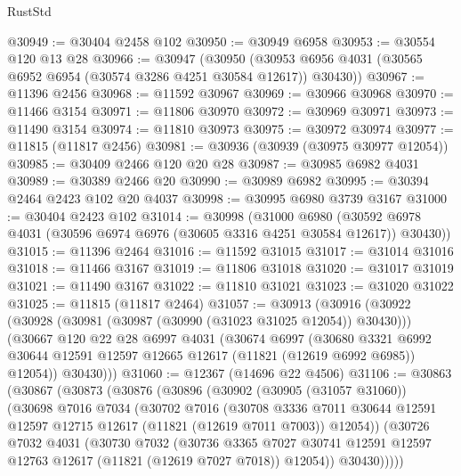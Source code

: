\begin{lexlean}{RustStd}
\begin{coremodule}
@30949 := @30404 @2458 @102
@30950 := @30949 @6958
@30953 := @30554 @120 @13 @28
@30966 := @30947
    (@30950 (@30953 @6956 @4031 (@30565 @6952 @6954 (@30574 @3286 @4251 @30584 @12617)) @30430))
@30967 := @11396 @2456
@30968 := @11592 @30967
@30969 := @30966 @30968
@30970 := @11466 @3154
@30971 := @11806 @30970
@30972 := @30969 @30971
@30973 := @11490 @3154
@30974 := @11810 @30973
@30975 := @30972 @30974
@30977 := @11815 (@11817 @2456)
@30981 := @30936 (@30939 (@30975 @30977 @12054))
@30985 := @30409 @2466 @120 @20 @28
@30987 := @30985 @6982 @4031
@30989 := @30389 @2466 @20
@30990 := @30989 @6982
@30995 := @30394 @2464 @2423 @102 @20 @4037
@30998 := @30995 @6980 @3739 @3167
@31000 := @30404 @2423 @102
@31014 := @30998
    (@31000
      @6980
      (@30592 @6978 @4031 (@30596 @6974 @6976 (@30605 @3316 @4251 @30584 @12617)) @30430))
@31015 := @11396 @2464
@31016 := @11592 @31015
@31017 := @31014 @31016
@31018 := @11466 @3167
@31019 := @11806 @31018
@31020 := @31017 @31019
@31021 := @11490 @3167
@31022 := @11810 @31021
@31023 := @31020 @31022
@31025 := @11815 (@11817 @2464)
@31057 := @30913
    (@30916
      (@30922
        (@30928 (@30981 (@30987 (@30990 (@31023 @31025 @12054)) @30430)))
        (@30667
          @120
          @22
          @28
          @6997
          @4031
          (@30674
            @6997
            (@30680
              @3321
              @6992
              @30644
              @12591
              @12597
              @12665
              @12617
              (@11821 (@12619 @6992 @6985))
              @12054))
          @30430)))
@31060 := @12367 (@14696 @22 @4506)
@31106 := @30863
    (@30867
      (@30873
        (@30876
          (@30896
            (@30902
              (@30905 (@31057 @31060))
              (@30698
                @7016
                @7034
                (@30702
                  @7016
                  (@30708
                    @3336
                    @7011
                    @30644
                    @12591
                    @12597
                    @12715
                    @12617
                    (@11821 (@12619 @7011 @7003))
                    @12054))
                (@30726
                  @7032
                  @4031
                  (@30730
                    @7032
                    (@30736
                      @3365
                      @7027
                      @30741
                      @12591
                      @12597
                      @12763
                      @12617
                      (@11821 (@12619 @7027 @7018))
                      @12054))
                  @30430)))))

\end{coremodule}
\end{lexlean}
